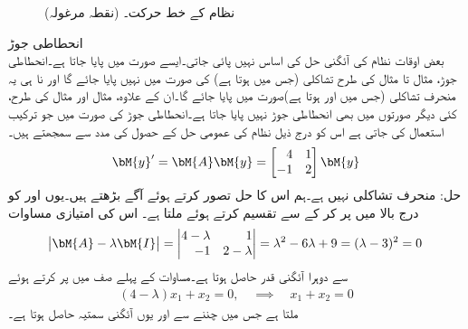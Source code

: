 \begin{figure}
\centering
{}
\caption{نظام  کے خط حرکت۔ (نقطہ مرغولہ)}
\label{شکل_نظام_نقطہ_مرغولہ}
\end{figure}
\quad انحطاطی جوڑ\\
بعض اوقات نظام کی آئگنی حل کی اساس نہیں پائی جاتی۔ایسے صورت میں  پایا جاتا ہے۔انحطاطی جوڑ، مثال  تا مثال  کی طرح تشاکلی  (جس میں  ہوتا ہے) کی صورت میں نہیں پایا جائے گا اور نا ہی یہ منحرف تشاکلی (جس میں  اور  ہوتا ہے)صورت میں پایا جائے  گا۔ان کے علاوہ، مثال  اور مثال  کی طرح،  کئی دیگر صورتوں میں بھی انحطاطی جوڑ نہیں پایا جاتا ہے۔انحطاطی جوڑ کی صورت میں جو ترکیب استعمال کی جاتی ہے اس کو درج ذیل نظام  کی عمومی حل کے حصول کی مدد سے سمجھتے ہیں۔
\begin{align}\label{مساوات_نظام_انحطاطی_جوڑ_الف}
\bM{y}'=\bM{A}\bM{y}=\begin{bmatrix*}[r] 4 & 1 \\ -1 & 2 \end{bmatrix*}\bM{y}
\end{align}
حل: منحرف تشاکلی نہیں ہے۔ہم اس کا حل  تصور کرتے ہوئے آگے بڑھتے ہیں۔یوں  اور  کو درج بالا میں پر کر کے  سے تقسیم کرتے ہوئے  ملتا ہے۔ اس کی امتیازی مساوات
\begin{align*}
\abs{\bM{A}-\lambda \bM{I}}=\begin{vmatrix*}[r] 4-\lambda& 1\\-1&2-\lambda \end{vmatrix*}=\lambda^2-6\lambda+9=(\lambda-3)^2=0
\end{align*}
سے دوہرا آئگنی قدر  حاصل ہوتا ہے۔مساوات  کے پہلے صف میں  پر کرتے ہوئے
\begin{align*}
(4-\lambda)x_1+x_2=0, \quad \implies \quad x_1+x_2=0
\end{align*}
ملتا ہے جس میں  چننے سے  اور یوں آئگنی سمتیہ  حاصل ہوتا ہے۔

